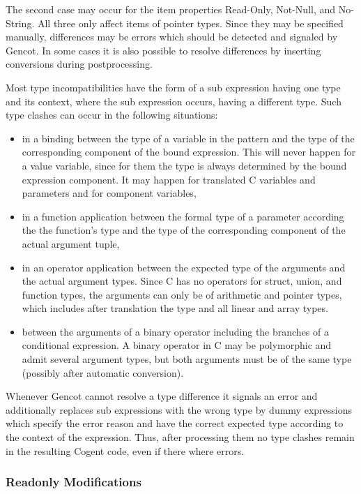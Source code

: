The second case may occur for the item properties Read-Only, Not-Null, and No-String. All three only affect items of pointer
types. Since they may be specified manually, differences may be errors which should be detected and signaled by Gencot. In some
cases it is also possible to resolve differences by inserting conversions during postprocessing.

Most type incompatibilities have the form of a sub expression having one type and its context, where the sub expression occurs,
having a different type. Such type clashes can occur in the following situations:
\begin{itemize}
\item in a binding between the type of a variable in the pattern and the type of the corresponding component of the bound
expression. This will never happen for a value variable, since for them the type is always determined by the bound expression
component. It may happen for translated C variables and parameters and for component variables,
\item in a function application between the formal type of a parameter according the the function's type and the type of
the corresponding component of the actual argument tuple,
\item in an operator application between the expected type of the arguments and the actual argument types. Since C has no operators
for struct, union, and function types, the arguments can only be of arithmetic and pointer types, which includes after
translation the type  and all linear and array types.
\item between the arguments of a binary operator including the branches of a conditional expression. A binary operator in C
may be polymorphic and admit several argument types, but both arguments must be of the same type (possibly after automatic
conversion).
\end{itemize}

Whenever Gencot cannot resolve a type difference it signals an error and additionally replaces sub expressions with the wrong type
by dummy expressions which specify the error reason and have the correct expected type according to the context of the expression.
Thus, after processing them no type clashes remain in the resulting Cogent code, even if there where errors.

\subsubsection{Readonly Modifications}

